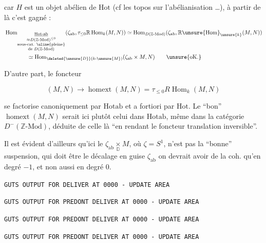 car $H$ est un objet abélien de $\mathrm{Hot}$ (cf les topos sur l'abélianisation \ldots), à partir de là c'est gagné :

\[
\begin{aligned}
&\operatorname{Hom}_{\underset{\substack{\approx D(\mathbb Z\text{-}\mathrm{Mod})^{\leq0}\\
\text{sous-cat. }\text{\uline{pleine}}\\\text{de }D(\mathbb Z\text{-}\mathrm{Mod})}}{\underline{\mathrm{Hot}\text{-}\mathrm{ab}}}}
(\zeta_{\mathrm{ab}},\tau_{\leq0}\mathbb R\operatorname{Hom}_k(M,N))
\simeq\operatorname{Hom}_{D(\mathbb Z\text{-}\mathrm{Mod})}
(\zeta_{\mathrm{ab}},\mathbb R\unsure{\operatorname{Hom}}_{\unsure{k}}(M,N))\\
&\hspace{4em}\simeq\operatorname{Hom}_{\deleted{\unsure{D}}(k\text{-}\unsure{M})}(\zeta_{\mathrm{ab}}\times M,N)
\qquad\text{\unsure{oK.}}
\end{aligned}
\]

D'autre part, le foncteur

\[
(M,N)\longrightarrow\operatorname{homext}(M,N)=\tau_{\leq0}R\operatorname{Hom}_k(M,N)
\]

se factorise canoniquement par $\mathrm{Hotab}$ et a fortiori par $\mathrm{Hot}$. Le ``bon'' $\operatorname{homext}(M,N)$ serait ici plutôt celui dans $\mathrm{Hotab}$,  même dans la catégorie $D^{-}(\mathbb Z\text{-}\mathrm{Mod})$, déduite de celle là  ``en rendant le foncteur translation inversible''.

Il est évident d'ailleurs qu'ici le $\zeta_{\mathrm{ab}}\mathbin{\underset{\mathbb D}{\times}}M$, où $\zeta=S^1$, n'est pas la ``bonne'' suspension, qui doit être le décalage  en guise  $\zeta_{\mathrm{ab}}$ on devrait avoir de la coh. qu'en degré $-1$, et non aussi en degré $0$.


\texttt{GUTS OUTPUT FOR  DELIVER AT 0000 - UPDATE AREA}

\texttt{GUTS OUTPUT FOR PREDONT DELIVER AT 0000 - UPDATE AREA}

\texttt{GUTS OUTPUT FOR PREDONT DELIVER AT 0000 - UPDATE AREA}

\texttt{GUTS OUTPUT FOR PREDONT DELIVER AT 0000 - UPDATE AREA}

